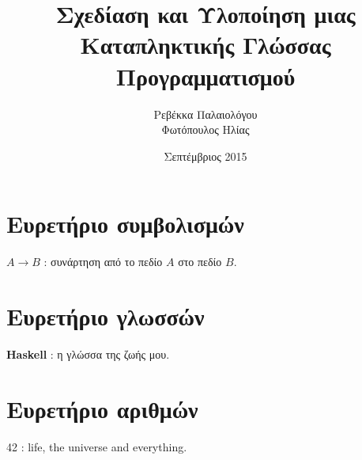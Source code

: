 \documentclass[diploma]{Styles/softlab-thesis}
\begin{document}

\frontmatter

\title{Σχεδίαση και Υλοποίηση μιας Καταπληκτικής Γλώσσας Προγραμματισμού}
\author{Ρεβέκκα Παλαιολόγου\\Φωτόπουλος Ηλίας}
\date{Σεπτέμβριος 2015}




\maketitle






\tableofcontents
\listoftables
\listoffigures



\mainmatter










\backmatter

\appendix

\chapter{Ευρετήριο συμβολισμών}

$A \rightarrow B$ : συνάρτηση από το πεδίο $A$ στο πεδίο $B$.

\chapter{Ευρετήριο γλωσσών}

\textbf{Haskell} : η γλώσσα της ζωής μου.

\chapter{Ευρετήριο αριθμών}

42 : life, the universe and everything.


\end{document}
